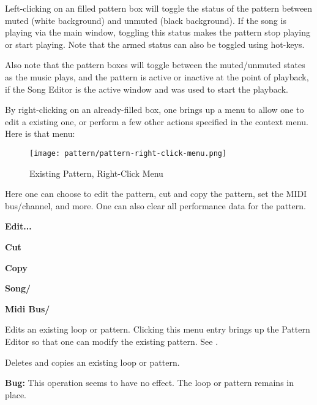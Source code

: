    Left-clicking on an filled pattern box will toggle the status of the
   pattern between muted (white background) and unmuted (black background).
   If the song is playing via the main window, toggling this status makes
   the pattern stop playing or start playing.  Note that the armed status
   can also be toggled using hot-keys.

   Also note that the pattern boxes will toggle between the muted/unmuted
   states as the music plays, and the pattern is active or inactive at the
   point of playback, if the Song Editor is the active window and was used
   to start the playback.

   By right-clicking on an already-filled box, one brings up a menu
   to allow one to edit a existing one, or perform a few other actions
   specified in the context menu.  Here is that menu:

\begin{figure}[H]
   \centering 
   \texttt{[image: pattern/pattern-right-click-menu.png]}
   \caption{Existing Pattern, Right-Click Menu}
   \label{fig:pattern_window_right_click}
\end{figure}

   Here one can choose to edit the pattern, cut and copy the pattern,
   set the MIDI bus/channel, and more.
   One can also clear all performance data for the pattern.
   
   \begin{enumber}
      \item \textbf{Edit...}
      \item \textbf{Cut}
      \item \textbf{Copy}
      \item \textbf{Song/}
      \item \textbf{Midi Bus/}
   \end{enumber}

   \setcounter{ItemCounter}{0}      %

   Edits an existing loop or pattern.
   Clicking this menu entry brings up the Pattern Editor
   so that one can modify the existing pattern.
   See .

   Deletes and copies an existing loop or pattern.

   \textbf{Bug:}
   This operation seems to have no effect.  The loop or pattern remains in
   place.

